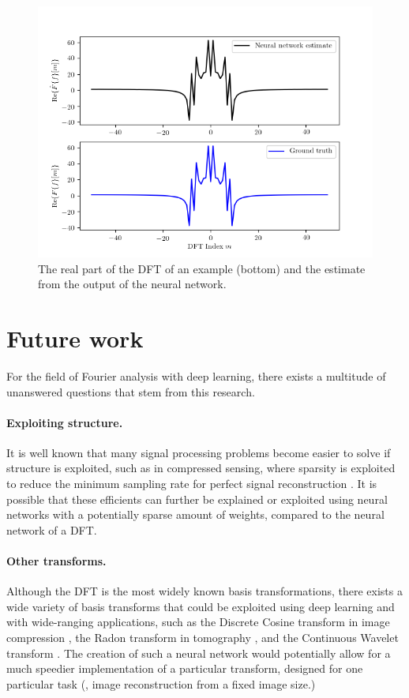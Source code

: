 \documentclass[12pt]{article}
\begin{document}
\begin{figure}
\centering
\includegraphics[scale=.75]{figures/DFT_comparisons.png}
\caption{The real part of the DFT of an example (bottom) and the estimate from the output of the neural network.}
\label{f-DFT_compare}
\end{figure}

\section{Future work}
For the field of Fourier analysis with deep learning, there exists a multitude of unanswered questions that stem from 
this research.

\paragraph{Exploiting structure.} It is well known that many signal processing problems become easier to solve if structure is
exploited, such as in compressed sensing, where sparsity is exploited to reduce the minimum sampling rate for perfect signal
reconstruction \cite{D:06}. It is possible that these efficients can further be explained or exploited using neural networks
with a potentially sparse amount of weights, compared to the neural network of a DFT.

\paragraph{Other transforms.} Although the DFT is the most widely known basis transformations, there exists a wide variety of
basis transforms that could be exploited using deep learning and with wide-ranging applications, such as the Discrete
Cosine transform in image compression \cite{ANR:74,YL:95}, the Radon transform in tomography \cite{D:07}, and the Continuous 
Wavelet transform \cite{M:08}. The creation of such a neural network would potentially allow for a much speedier implementation 
of a particular transform, designed for one particular task (\eg, image reconstruction from a fixed image size.)
\end{document}
